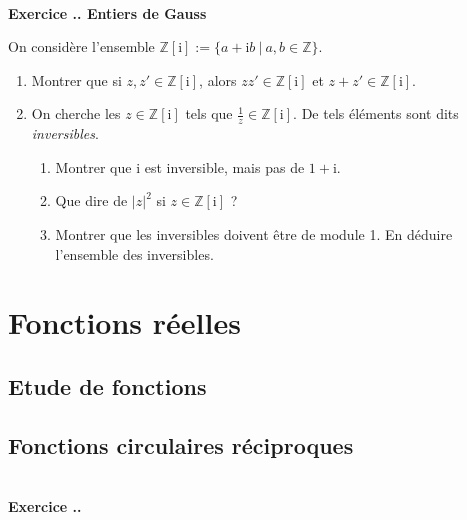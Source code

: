 \documentclass{article}
\newcommand{\mb}[1]{\mathbb{#1}}
\newcounter{exo}
\newcommand{\exercice}[1][\null]{\textbf{\\ Exercice \thesection.\theexo. #1} \addtocounter{exo}{1}}
\begin{document}
\exercice[Entiers de Gauss]

On considère l'ensemble $\mb{Z}[\text{i}] := \{a + \text{i}b~|~a, b \in \mb{Z}\}$.

\begin{enumerate}

\item Montrer que si $z, z' \in \mb{Z}[\text{i}]$, alors $zz' \in \mb{Z}[\text{i}]$ et $z+z' \in \mb{Z}[\text{i}]$.

\item On cherche les $z \in \mb{Z}[\text{i}] $ tels que $ \frac{1}{z} \in \mb{Z}[\text{i}]$. De tels éléments sont dits \emph{inversibles}.

\begin{enumerate}

\item Montrer que $\text{i}$ est inversible, mais pas de $1+ \text{i}$.

\item Que dire de $|z|^2$ si $z \in \mb{Z}[\text{i}]$ ?

\item Montrer que les inversibles doivent être de module 1. En déduire l'ensemble des inversibles.


\end{enumerate}


\end{enumerate}



















\section{Fonctions réelles}

\subsection{Etude de fonctions}
        
\subsection{Fonctions circulaires réciproques}

\exercice
\end{document}
